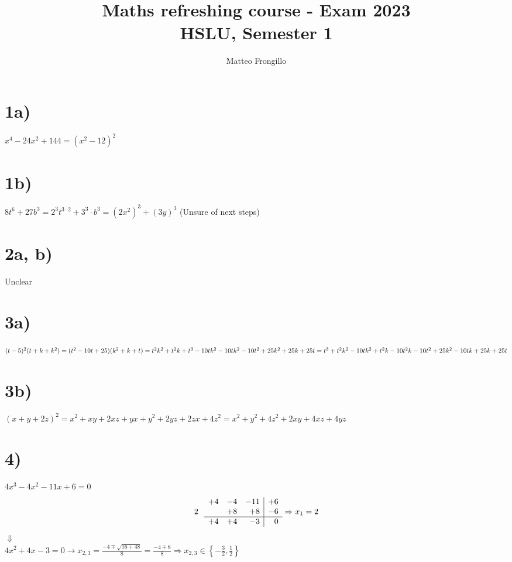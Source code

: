 \documentclass{article}
\title{\textbf{Maths refreshing course - Exam 2023 \\ HSLU, Semester 1}}
\author{Matteo Frongillo}
\begin{document}
\maketitle

\section*{1a)}
\(x^4 - 24x^2 + 144 = (x^2 - 12)^2\)

\section*{1b)}
\(8t^6 + 27b^3 = 2^3t^{3 \cdot 2} + 3^3 \cdot b^3 = (2x^2)^3 + (3y)^3\) (Unsure of next steps)

\section*{2a, b)}
Unclear

\section*{3a)}
\((t-5)^2(t+k+k^2)\\
    = (t^2 - 10t + 25)(k^2 + k + t)\\
    = t^2k^2+t^2k+t^3-10tk^2-10tk^2-10t^2+25k^2+25k+25t\\
    = t^3+t^2k^2-10tk^2+t^2k-10t^2k-10t^2+25k^2-10tk+25k+25t
\)

\section*{3b)}
\((x+y+2z)^2 = x^2+xy+2xz+yx+y^2+2yz+2zx+4z^2 = x^2+y^2+4z^2+2xy+4xz+4yz\)


\section*{4)}
\(4x^3-4x^2-11x+6=0\)
\[ 2 \hspace{.25cm}
\begin{array}{rrr|r}
    +4 & -4 & -11 & +6 \\
    & +8  & +8  & -6 \\
\hline
    +4 & +4  & -3  & 0
\end{array} \Rightarrow x_1 = 2
\] 
\hspace{2.5cm}$\Downarrow$\\
\phantom{} \hspace{1.3cm}\(4x^2+4x-3=0 \rightarrow x_{2,3}=
    \frac{-4 \mp \sqrt{16+48}}{8}= \frac{-4 \mp 8}{8} \Rightarrow
    x_{2,3} \in \left\{-\frac{3}{2}, \frac{1}{2}\right\}\)
\end{document}
